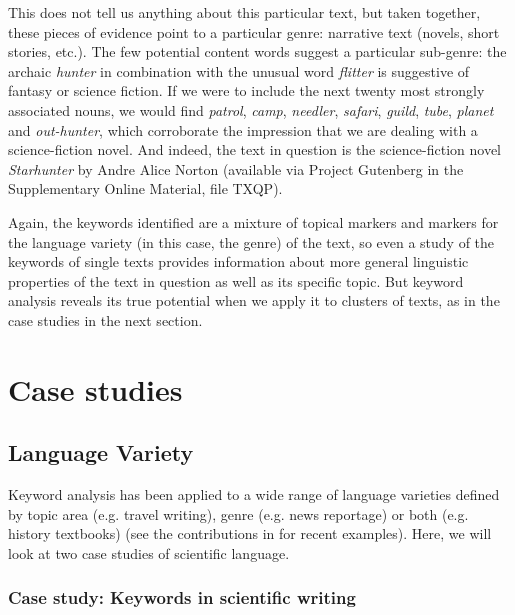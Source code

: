 This does not tell us anything about this particular text, but taken together, these pieces of evidence point to a particular genre:  narrative text (novels,  short stories, etc.). The few potential content words suggest a particular sub\hyp{}genre: the archaic \textit{hunter} in combination with the unusual word \textit{flitter} is suggestive of fantasy or science fiction. If we were to include the next twenty most strongly associated  nouns,  we would find \textit{patrol}, \textit{camp}, \textit{needler}, \textit{safari}, \textit{guild}, \textit{tube}, \textit{planet} and \textit{out\hyp{}hunter}, which corroborate the impression that we are dealing with a science\hyp{}fiction  novel. And indeed, the text in question is the science\hyp{}fiction novel \textit{Starhunter} by Andre Alice Norton (available via Project Gutenberg in the Supplementary Online Material, file TXQP).

Again, the keywords  identified are a mixture of topical markers and markers for the language variety  (in this case, the genre)  of the text, so even a study of the keywords of single texts provides information about more general linguistic properties of the text in question as well as its specific topic. But keyword  analysis reveals its true potential when we apply it to clusters of texts, as in the case studies in the next section.

\section{Case studies}\label{sec:keywordcasestudies}
\subsection{Language Variety}\label{sec:texttype}

Keyword  analysis has been applied to a wide range of language varieties  defined by topic area (e.g. travel writing), genre  (e.g. news reportage)  or both (e.g. history textbooks) (see the contributions in \citealt{bondi_keyness_2010} for recent examples). Here, we will look at two case studies of scientific language.

\subsubsection{Case study: Keywords in scientific writing}
\label{sec:keywordsinscientificwriting}

